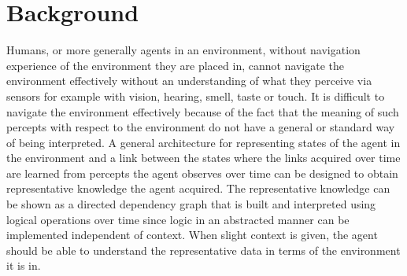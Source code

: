 \section{Background}



Humans, or more generally agents in an environment, without navigation experience of the environment they are placed in, cannot navigate the environment effectively without an understanding of what they perceive via sensors for example with vision, hearing, smell, taste or touch.
It is difficult to navigate the environment effectively because of the fact that the meaning of such percepts with respect to the environment do not have a general or standard way of being interpreted. 
A general architecture for representing states of the agent in the environment and a link between the states where the links acquired over time are learned from percepts the agent observes over time can be designed to obtain representative knowledge the agent acquired. 
The representative knowledge can be shown as a directed dependency graph that is built and interpreted using logical operations over time since logic in an abstracted manner can be implemented independent of context. When slight context is given, the agent should be able to understand the representative data in terms of the environment it is in.


